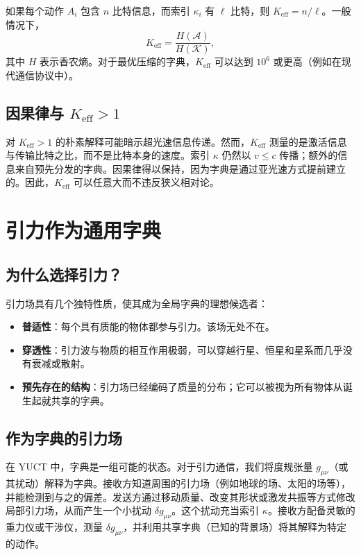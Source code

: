 \documentclass[12pt,a4paper]{article}
\newcommand{\Keff}{K_{\mathrm{eff}}}
\begin{document}
	如果每个动作 \(A_i\) 包含 \(n\) 比特信息，而索引 \(\kappa_i\) 有 \(\ell\) 比特，则 \(\Keff = n/\ell\)。一般情况下，
	\begin{equation}
		\Keff = \frac{H(\mathcal{A})}{H(\mathcal{K})},
	\end{equation}
	其中 \(H\) 表示香农熵。对于最优压缩的字典，\(\Keff\) 可以达到 \(10^6\) 或更高（例如在现代通信协议中）。
	
	\subsection{因果律与 \(K_{\mathrm{eff}} > 1\)}
	\label{subsec:causality}
	
	对 \(\Keff > 1\) 的朴素解释可能暗示超光速信息传递。然而，\(\Keff\) 测量的是激活信息与传输比特之比，而不是比特本身的速度。索引 \(\kappa\) 仍然以 \(v \le c\) 传播；额外的信息来自预先分发的字典。因果律得以保持，因为字典是通过亚光速方式提前建立的。因此，\(\Keff\) 可以任意大而不违反狭义相对论。
	
	\section{引力作为通用字典}
	\label{sec:gravity}
	
	\subsection{为什么选择引力？}
	
	引力场具有几个独特性质，使其成为全局字典的理想候选者：
	\begin{itemize}
		\item \textbf{普适性}：每个具有质能的物体都参与引力。该场无处不在。
		\item \textbf{穿透性}：引力波与物质的相互作用极弱，可以穿越行星、恒星和星系而几乎没有衰减或散射。
		\item \textbf{预先存在的结构}：引力场已经编码了质量的分布；它可以被视为所有物体从诞生起就共享的字典。
	\end{itemize}
	
	\subsection{作为字典的引力场}
	
	在 YUCT 中，字典是一组可能的状态。对于引力通信，我们将度规张量 \(g_{\mu\nu}\)（或其扰动）解释为字典。接收方知道周围的引力场（例如地球的场、太阳的场等），并能检测到与之的偏差。发送方通过移动质量、改变其形状或激发共振等方式修改局部引力场，从而产生一个小扰动 \(\delta g_{\mu\nu}\)。这个扰动充当索引 \(\kappa\)。接收方配备灵敏的重力仪或干涉仪，测量 \(\delta g_{\mu\nu}\)，并利用共享字典（已知的背景场）将其解释为特定的动作。
	
\end{document}
